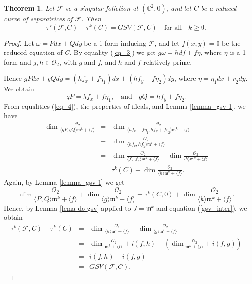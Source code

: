 \documentclass[12pt,letterpaper]{amsart}
\newcommand{\C}{\mathbb{C}}
\newcommand{\F}{\mathcal{F}}
\newcommand{\m}{\mathfrak{m}}
\newtheorem{theorem}{Theorem}[section]
\begin{document}
\begin{theorem}\label{teoA}
\label{teo tk}
 Let $\F$ be a singular foliation at $(\C^2,0)$, and let $C$ be a reduced curve of separatrices of $\F$. Then
    \[\tau^{k}(\F,C)-\tau^{k}(C)=GSV(\F,C)\quad\text{for all}\quad k\geq 0.\]
\end{theorem}
\begin{proof}
  Let  $\omega=Pdx+Qdy$ be a 1-form inducing $\F$, and let $f(x,y)=0$ be the reduced equation of $C$. By equality (\ref{eq_3}) we get $g\omega=hdf+f\eta$, where $\eta$ is a 1-form and $g,h\in\mathcal{O}_2$, with $g$ and $f$, and $h$ and $f$ relatively prime. 
  \par Hence $gPdx+gQdy=(hf_x+f\eta_1)dx+(hf_y +f\eta_2)dy$, where $\eta=\eta_1 dx+\eta_2 dy$. We obtain 
  \begin{equation}\label{eq_4}
      g P=hf_x+f\eta_1,\quad\text{and}\quad gQ=hf_y +f\eta_2.
  \end{equation}
From equalities (\ref{eq_4}), the properties of ideals, and Lemma \ref{lemma_gsv 1}, we have
  \begin{eqnarray*}
\dim\frac{\mathcal{O}_2}{\langle gP,gQ\rangle\m^k+\langle f\rangle}&=& \dim\frac{\mathcal{O}_2}{\langle hf_x+f\eta_1,hf_y+f\eta_2\rangle\m^k+\langle f\rangle}\\
&=&\dim\frac{\mathcal{O}_2}{\langle hf_x,h f_y\rangle \m^k+\langle f\rangle}\\
&=& \dim\frac{\mathcal{O}_2}{\langle f_x, f_y\rangle \m^k+\langle f\rangle}+\dim\frac{\mathcal{O}_2}{\langle h\rangle \m^k+\langle f\rangle}\\
&=&\tau^{k}(C)+\dim\frac{\mathcal{O}_2}{\langle h\rangle \m^k+\langle f\rangle}.
  \end{eqnarray*}
  Again, by Lemma \ref{lemma_gsv 1} we get
  \[\dim\frac{\mathcal{O}_2}{\langle P,Q\rangle \m^k+\langle f\rangle}+\dim\frac{\mathcal{O}_2}{\langle g\rangle \m^k+\langle f\rangle}=\tau^{k}(C,0)+\dim\frac{\mathcal{O}_2}{\langle h\rangle \m^k+\langle f\rangle}.\]
  Hence, by Lemma \ref{lema do gsv} applied to $J=\m^k$ and equation (\ref{gsv_inter}), we obtain
  \begin{eqnarray*}
  \tau^k(\F,C)-\tau^k(C)&=&\dim\frac{\mathcal{O}_2}{\langle h\rangle \m^{k}+\langle f\rangle}-\dim\frac{\mathcal{O}_2}{\langle g\rangle \m^{k}+\langle f\rangle}\\
  &=& \dim \frac{\mathcal{O}_2}{\m^k+\langle f\rangle}+i(f,h)-\left(\dim \frac{\mathcal{O}_2}{\m^k+\langle f\rangle}+i(f,g)\right)\\
&=& i(f,h)-i(f,g)\\
&=& GSV(\F,C).
\end{eqnarray*}
\end{proof}
\end{document}
